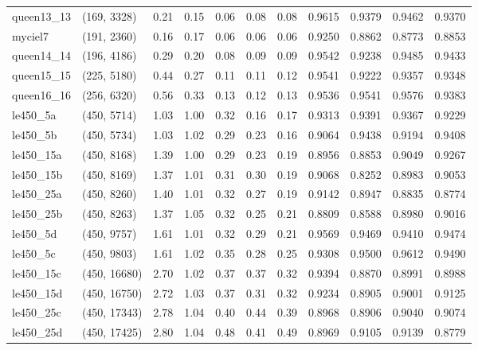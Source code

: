 \begin{tabular}{llrrrrrrrrr}
queen13\_13 &  (169, 3328) &  0.21 & 0.15 & 0.06 &  0.08 &   0.08 &   0.9615 &   0.9379 &     0.9462 &      0.9370 \\
   myciel7 &  (191, 2360) &  0.16 & 0.17 & 0.06 &  0.06 &   0.06 &   0.9250 &   0.8862 &     0.8773 &      0.8853 \\
queen14\_14 &  (196, 4186) &  0.29 & 0.20 & 0.08 &  0.09 &   0.09 &   0.9542 &   0.9238 &     0.9485 &      0.9433 \\
queen15\_15 &  (225, 5180) &  0.44 & 0.27 & 0.11 &  0.11 &   0.12 &   0.9541 &   0.9222 &     0.9357 &      0.9348 \\
queen16\_16 &  (256, 6320) &  0.56 & 0.33 & 0.13 &  0.12 &   0.13 &   0.9536 &   0.9541 &     0.9576 &      0.9383 \\
  le450\_5a &  (450, 5714) &  1.03 & 1.00 & 0.32 &  0.16 &   0.17 &   0.9313 &   0.9391 &     0.9367 &      0.9229 \\
  le450\_5b &  (450, 5734) &  1.03 & 1.02 & 0.29 &  0.23 &   0.16 &   0.9064 &   0.9438 &     0.9194 &      0.9408 \\
 le450\_15a &  (450, 8168) &  1.39 & 1.00 & 0.29 &  0.23 &   0.19 &   0.8956 &   0.8853 &     0.9049 &      0.9267 \\
 le450\_15b &  (450, 8169) &  1.37 & 1.01 & 0.31 &  0.30 &   0.19 &   0.9068 &   0.8252 &     0.8983 &      0.9053 \\
 le450\_25a &  (450, 8260) &  1.40 & 1.01 & 0.32 &  0.27 &   0.19 &   0.9142 &   0.8947 &     0.8835 &      0.8774 \\
 le450\_25b &  (450, 8263) &  1.37 & 1.05 & 0.32 &  0.25 &   0.21 &   0.8809 &   0.8588 &     0.8980 &      0.9016 \\
  le450\_5d &  (450, 9757) &  1.61 & 1.01 & 0.32 &  0.29 &   0.21 &   0.9569 &   0.9469 &     0.9410 &      0.9474 \\
  le450\_5c &  (450, 9803) &  1.61 & 1.02 & 0.35 &  0.28 &   0.25 &   0.9308 &   0.9500 &     0.9612 &      0.9490 \\
 le450\_15c & (450, 16680) &  2.70 & 1.02 & 0.37 &  0.37 &   0.32 &   0.9394 &   0.8870 &     0.8991 &      0.8988 \\
 le450\_15d & (450, 16750) &  2.72 & 1.03 & 0.37 &  0.31 &   0.32 &   0.9234 &   0.8905 &     0.9001 &      0.9125 \\
 le450\_25c & (450, 17343) &  2.78 & 1.04 & 0.40 &  0.44 &   0.39 &   0.8968 &   0.8906 &     0.9040 &      0.9074 \\
 le450\_25d & (450, 17425) &  2.80 & 1.04 & 0.48 &  0.41 &   0.49 &   0.8969 &   0.9105 &     0.9139 &      0.8779 \\
\bottomrule
\end{tabular}
